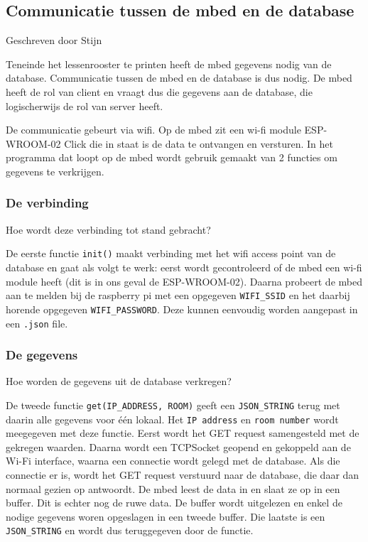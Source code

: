 \documentclass[a4paper,kul]{kulakarticle} %
\begin{document}
\subsection{Communicatie tussen de mbed en de database}
{\scriptsize Geschreven door Stijn}
\newline

Teneinde het lessenrooster te printen heeft de mbed gegevens nodig van de database. Communicatie tussen de mbed en de database is dus nodig. De mbed heeft de rol van client en vraagt dus die gegevens aan de database, die logischerwijs de rol van server heeft.
\newline

De communicatie gebeurt via wifi. Op de mbed zit een wi-fi module ESP-WROOM-02 Click \cite{ESP-WROOM-02} die in staat is de data te ontvangen en versturen. In het programma dat loopt op de mbed wordt gebruik gemaakt van 2 functies om gegevens te verkrijgen.

\subsubsection{De verbinding}

Hoe wordt deze verbinding tot stand gebracht?

De eerste functie \verb|init()| maakt verbinding met het wifi access point van de database en gaat als volgt te werk: eerst wordt gecontroleerd of de mbed een wi-fi module heeft (dit is in ons geval de ESP-WROOM-02). Daarna probeert de mbed aan te melden bij de raspberry pi met een opgegeven \verb|WIFI_SSID| en het daarbij horende opgegeven \verb|WIFI_PASSWORD|. Deze  kunnen eenvoudig worden aangepast in een \verb|.json| file.

\subsubsection{De gegevens}

Hoe worden de gegevens uit de database verkregen?

De tweede functie \verb|get(IP_ADDRESS, ROOM)| geeft een \verb|JSON_STRING| terug met daarin alle gegevens voor één lokaal. Het \verb|IP address| en \verb|room number| wordt meegegeven met deze functie. Eerst wordt het GET request samengesteld met de gekregen waarden. Daarna wordt een TCPSocket geopend en gekoppeld aan de Wi-Fi interface, waarna een connectie wordt gelegd met de database. Als die connectie er is, wordt het GET request verstuurd naar de database, die daar dan normaal gezien op antwoordt. De mbed leest de data in en slaat ze op in een buffer. Dit is echter nog de ruwe data. De buffer wordt uitgelezen en enkel de nodige gegevens woren opgeslagen in een tweede buffer. Die laatste is een \verb|JSON_STRING| en wordt dus teruggegeven door de functie.
\end{document}
